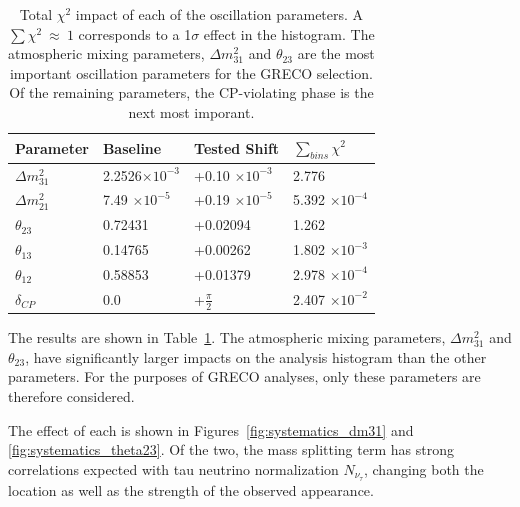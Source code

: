 \begin{table}[]
\centering
\begin{tabular}{@{}llll@{}}
\toprule
Parameter                & Baseline                                         & Tested Shift                                   & $\sum_{bins}\chi^2$                     \\ \midrule
$\Delta m^2_{31}$ & 2.2526${\times 10^{-3}}$ & +0.10 ${\times 10^{-3}}$  & 2.776                                             \\
$\Delta m^2_{21}$ & 7.49 ${\times 10^{-5}}$    & +0.19 ${\times 10^{-5}}$  & 5.392  ${\times 10^{-4}}$  \\
$\theta_{23}$        & 0.72431                                        & +0.02094                                       & 1.262                                             \\
$\theta_{13}$        & 0.14765                                        & +0.00262                                       & 1.802 ${\times 10^{-3}}$   \\
$\theta_{12}$        & 0.58853                                        & +0.01379                                       & 2.978 ${\times 10^{-4}}$   \\ 
$\delta_{CP}$         & 0.0                                                & +$\frac{\pi}{2}$                             & 2.407 ${\times 10^{-2}}$    \\ \bottomrule
\end{tabular}
\caption[Total $\chi^2$ impact of each of the oscillation parameters]{Total $\chi^2$ impact of each of the oscillation parameters. A $\sum\chi^2~\approx~1$ corresponds to a 1$\sigma$ effect in the histogram. The atmospheric mixing parameters, $\Delta m^2_{31}$ and $\theta_{23}$ are the most important oscillation parameters for the GRECO selection. Of the remaining parameters, the CP-violating phase is the next most imporant. }
\label{tab:oscil_impact}
\end{table}

The results are shown in Table~\ref{tab:oscil_impact}.
The atmospheric mixing parameters, $\Delta m^2_{31}$ and $\theta_{23}$, have significantly larger impacts on the analysis histogram than the other parameters.
For the purposes of GRECO analyses, only these parameters are therefore considered.

The effect of each is shown in Figures~\ref{fig:systematics_dm31} and \ref{fig:systematics_theta23}.
Of the two, the mass splitting term has strong correlations expected with tau neutrino normalization $N_{\nu_\tau}$, changing both the location as well as the strength of the observed appearance.

